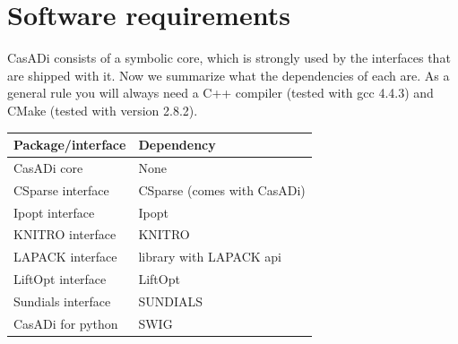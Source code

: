 \documentclass[a4paper,12pt]{book}
\begin{document}
\section{Software requirements}
CasADi consists of a symbolic core, which is strongly used by the interfaces that are shipped with it. Now we summarize
what the dependencies of each are. As a general rule you will always need a C++ compiler (tested with gcc 4.4.3) and
CMake (tested with version 2.8.2).
\begin{center}
\small
\begin{tabular}{|l|l|}
\hline
\textbf{Package/interface} & \textbf{Dependency}\\
\hline
CasADi core & None \\
\hline
CSparse interface & CSparse (comes with CasADi)\\
\hline
Ipopt interface & Ipopt\\
\hline
KNITRO interface & KNITRO\\
\hline
LAPACK interface & library with LAPACK api\\
\hline
LiftOpt interface & LiftOpt\\
\hline
Sundials interface & SUNDIALS \\
\hline
CasADi for python & SWIG \\
\hline
\end{tabular}
\end{center}
\end{document}
